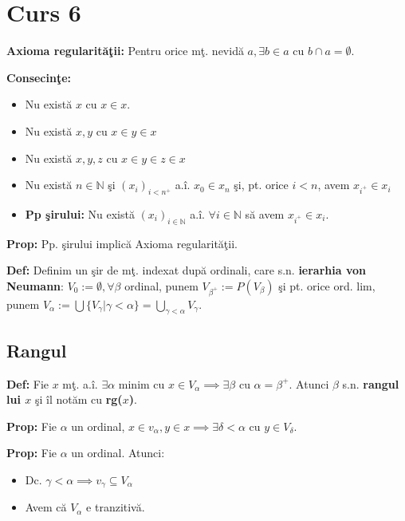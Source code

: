 \documentclass{article}
\begin{document}
\section{Curs 6}

\textbf{Axioma regularit\u a\c tii:} Pentru orice m\c t. nevid\u a $a,\exists b\in a$ cu $b\cap a=\emptyset$.

\textbf{Consecin\c te:}
\begin{itemize}
    \item Nu exist\u a $x$ cu $x\in x$.
    \item Nu exist\u a $x,y$ cu $x\in y\in x$
    \item Nu exist\u a $x,y,z$ cu $x\in y\in z\in x$
    \item Nu exist\u a $n\in \mathbb N$ \c si $(x_i)_{i<n^+}$ a.\^ i. $x_0\in x_n$ \c si, pt. orice $i<n$, avem $x_{i^+}\in x_i$
    \item \textbf{Pp \c sirului:} Nu exist\u a $(x_i)_{i\in \mathbb N}$ a.\^ i. $\forall i\in \mathbb N$ s\u a avem $x_{i^+}\in x_i $.
\end{itemize}

\textbf{Prop:} Pp. \c sirului implic\u a Axioma regularit\u a\c tii.

\textbf{Def:} Definim un \c sir de m\c t. indexat dup\u a ordinali, care s.n. \textbf{ierarhia von Neumann}: $V_0:=\emptyset, \forall \beta$ ordinal, punem $V_{\beta^+}:=P(V_\beta)$ \c si pt. orice ord. lim, punem $V_\alpha:=\bigcup\{V_\gamma|\gamma<\alpha\}=\bigcup_{\gamma<\alpha}V_\gamma$.

\subsection{Rangul}

\textbf{Def:} Fie $x$ m\c t. a.\^ i. $\exists \alpha$ minim cu $x\in V_\alpha \implies \exists \beta$ cu $\alpha=\beta^+$. Atunci $\beta$ s.n. \textbf{rangul lui $x$} \c si \^ il not\u am cu \textbf{rg($x$)}.

\textbf{Prop:} Fie $\alpha$ un ordinal, $x\in v_\alpha,y\in x \implies \exists \delta<\alpha$ cu $y\in V_\delta$.

\textbf{Prop:} Fie $\alpha$ un ordinal. Atunci:
\begin{itemize}
    \item Dc. $\gamma<\alpha \implies v_\gamma\subseteq V_\alpha$
    \item Avem c\u a $V_\alpha$ e tranzitiv\u a.
\end{itemize}
\end{document}
